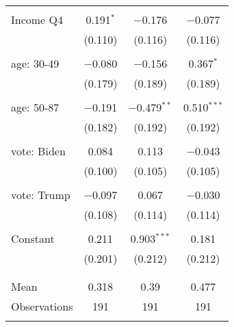 \begin{tabular}{@{\extracolsep{5pt}}lccc}
  & & & \\ 
 Income Q4 & 0.191$^{*}$ & $-$0.176 & $-$0.077 \\ 
  & (0.110) & (0.116) & (0.116) \\ 
  & & & \\ 
 age: 30-49 & $-$0.080 & $-$0.156 & 0.367$^{*}$ \\ 
  & (0.179) & (0.189) & (0.189) \\ 
  & & & \\ 
 age: 50-87 & $-$0.191 & $-$0.479$^{**}$ & 0.510$^{***}$ \\ 
  & (0.182) & (0.192) & (0.192) \\ 
  & & & \\ 
 vote: Biden & 0.084 & 0.113 & $-$0.043 \\ 
  & (0.100) & (0.105) & (0.105) \\ 
  & & & \\ 
 vote: Trump & $-$0.097 & 0.067 & $-$0.030 \\ 
  & (0.108) & (0.114) & (0.114) \\ 
  & & & \\ 
 Constant & 0.211 & 0.903$^{***}$ & 0.181 \\ 
  & (0.201) & (0.212) & (0.212) \\ 
  & & & \\ 
\hline \\[-1.8ex] 
Mean & 0.318 & 0.39 & 0.477 \\ 
Observations & 191 & 191 & 191 \\ 
\hline 
\hline \\[-1.8ex] 
\end{tabular} 
